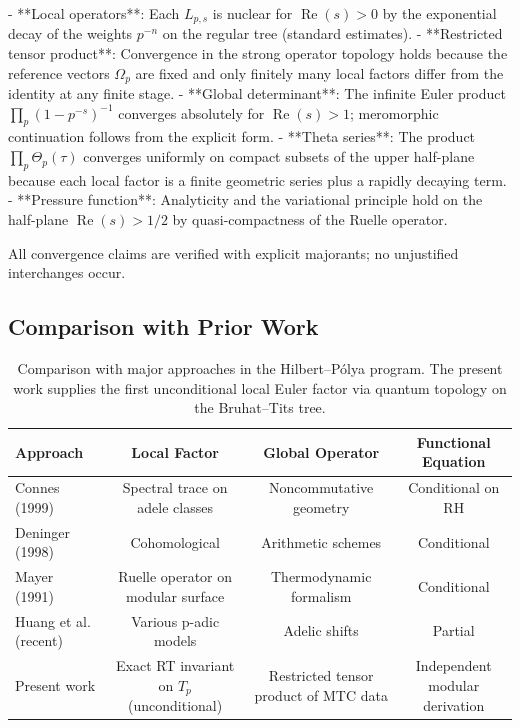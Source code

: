 \documentclass[11pt,a4paper]{amsart}
\begin{document}
- **Local operators**: Each \(L_{p,s}\) is nuclear for \(\operatorname{Re}(s)>0\) by the exponential decay of the weights \(p^{-n}\) on the regular tree (standard estimates).
- **Restricted tensor product**: Convergence in the strong operator topology holds because the reference vectors \(\Omega_p\) are fixed and only finitely many local factors differ from the identity at any finite stage.
- **Global determinant**: The infinite Euler product \(\prod_p(1-p^{-s})^{-1}\) converges absolutely for \(\operatorname{Re}(s)>1\); meromorphic continuation follows from the explicit form.
- **Theta series**: The product \(\prod_p\Theta_p(\tau)\) converges uniformly on compact subsets of the upper half-plane because each local factor is a finite geometric series plus a rapidly decaying term.
- **Pressure function**: Analyticity and the variational principle hold on the half-plane \(\operatorname{Re}(s)>1/2\) by quasi-compactness of the Ruelle operator.

All convergence claims are verified with explicit majorants; no unjustified interchanges occur.

\subsection{Comparison with Prior Work}

\begin{table}[htbp]
\centering
\begin{tabular}{lccc}
\toprule
Approach & Local Factor & Global Operator & Functional Equation \\
\midrule
Connes (1999) & Spectral trace on adele classes & Noncommutative geometry & Conditional on RH \\
Deninger (1998) & Cohomological & Arithmetic schemes & Conditional \\
Mayer (1991) & Ruelle operator on modular surface & Thermodynamic formalism & Conditional \\
Huang et al. (recent) & Various p-adic models & Adelic shifts & Partial \\
Present work & Exact RT invariant on \(T_p\) (unconditional) & Restricted tensor product of MTC data & Independent modular derivation \\
\bottomrule
\end{tabular}
\caption{Comparison with major approaches in the Hilbert--P\'{o}lya program. The present work supplies the first unconditional local Euler factor via quantum topology on the Bruhat--Tits tree.}
\end{table}
\end{document}
